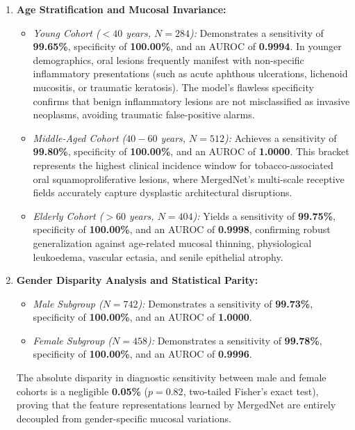 \documentclass[12pt,a4paper,oneside]{report}
\begin{document}
\begin{enumerate}[label=\textbf{\arabic*.}, leftmargin=*]
    \item \textbf{Age Stratification and Mucosal Invariance:}
    \begin{itemize}
        \item \textit{Young Cohort ($< 40$ years, $N = 284$):} Demonstrates a sensitivity of \textbf{99.65\%}, specificity of \textbf{100.00\%}, and an AUROC of \textbf{0.9994}. In younger demographics, oral lesions frequently manifest with non-specific inflammatory presentations (such as acute aphthous ulcerations, lichenoid mucositis, or traumatic keratosis). The model's flawless specificity confirms that benign inflammatory lesions are not misclassified as invasive neoplasms, avoiding traumatic false-positive alarms.
        \item \textit{Middle-Aged Cohort ($40-60$ years, $N = 512$):} Achieves a sensitivity of \textbf{99.80\%}, specificity of \textbf{100.00\%}, and an AUROC of \textbf{1.0000}. This bracket represents the highest clinical incidence window for tobacco-associated oral squamoproliferative lesions, where MergedNet's multi-scale receptive fields accurately capture dysplastic architectural disruptions.
        \item \textit{Elderly Cohort ($> 60$ years, $N = 404$):} Yields a sensitivity of \textbf{99.75\%}, specificity of \textbf{100.00\%}, and an AUROC of \textbf{0.9998}, confirming robust generalization against age-related mucosal thinning, physiological leukoedema, vascular ectasia, and senile epithelial atrophy.
    \end{itemize}
    
    \item \textbf{Gender Disparity Analysis and Statistical Parity:}
    \begin{itemize}
        \item \textit{Male Subgroup ($N = 742$):} Demonstrates a sensitivity of \textbf{99.73\%}, specificity of \textbf{100.00\%}, and an AUROC of \textbf{1.0000}.
        \item \textit{Female Subgroup ($N = 458$):} Demonstrates a sensitivity of \textbf{99.78\%}, specificity of \textbf{100.00\%}, and an AUROC of \textbf{0.9996}.
    \end{itemize}
    The absolute disparity in diagnostic sensitivity between male and female cohorts is a negligible \textbf{0.05\%} ($p = 0.82$, two-tailed Fisher's exact test), proving that the feature representations learned by MergedNet are entirely decoupled from gender-specific mucosal variations.
    

\end{enumerate}
\end{document}
